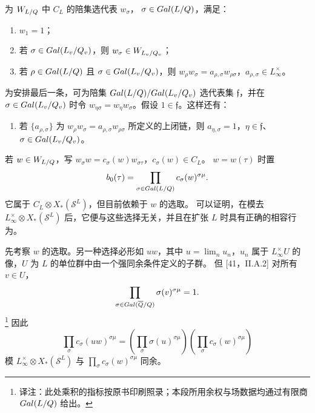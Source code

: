 为 $W_{L/Q}$ 中 $C_L$ 的陪集选代表 $w_\sigma$，
$\sigma\in Gal(L/Q)$，满足：
\begin{enumerate}
\item[(a)] $w_1=1$；
\item[(b)] 若 $\sigma\in Gal(L_v/Q_v)$，则 $w_\sigma\in W_{L_v/Q_v}$；
\item[(c)] 若 $\rho\in Gal(L/Q)$ 且 $\sigma\in Gal(L_v/Q_v)$，则
$w_\rho w_\sigma=a_{\rho,\sigma}w_{\rho\sigma}$，$a_{\rho,\sigma}\in L_\infty^\times$。
\end{enumerate}
为安排最后一条，可为陪集 $Gal(L/Q)/Gal(L_v/Q_v)$ 选代表集
$\mathfrak f$，并在 $\sigma\in Gal(L_v/Q_v)$ 时令
$w_{\eta\sigma}=w_\eta w_\sigma$。假设 $1\in\mathfrak f$。这样还有：
\begin{enumerate}
\item[(d)] 若 $\{a_{\rho,\sigma}\}$ 为
$w_\rho w_\sigma=a_{\rho,\sigma}w_{\rho\sigma}$ 所定义的上闭链，则
$a_{\eta,\sigma}=1$，$\eta\in\mathfrak f$、$\sigma\in Gal(L_v/Q_v)$。
\end{enumerate}
若 $w\in W_{L/Q}$，写
$w_\sigma w=c_\sigma(w)w_{\sigma\tau}$，$c_\sigma(w)\in C_L$。
$w=w(\tau)$ 时置
\[
b_0(\tau)=\prod_{\sigma\in Gal(L/Q)}c_\sigma(w)^{\sigma\mu}.
\]
它属于 $C_L\otimes X_*(\mathcal S^L)$，但目前依赖于 $w$ 的选取。
可以证明，在模去 $L_\infty^\times\otimes X_*(\mathcal S^L)$ 后，它便与这些选择无关，并且在扩张
$L$ 时具有正确的相容行为。

先考察 $w$ 的选取。另一种选择必形如 $uw$，其中
$u=\lim_nu_n$，$u_n$ 属于 $L_\infty^\times U$ 的像，$U$ 为 $L$ 的单位群中由一个强同余条件定义的子群。
但 [41，II.A.2] 对所有 $v\in U$，
\[
\prod_{\sigma\in Gal(\overline{Q}/Q)}\sigma(v)^{\sigma\mu}=1.
\]
\footnote{译注：此处乘积的指标按原书印刷照录；本段所用余权与场数据均通过有限商 $Gal(L/Q)$ 给出。}
因此
\[
\prod_\sigma c_\sigma(uw)^{\sigma\mu}
=\left(\prod_\sigma\sigma(u)^{\sigma\mu}\right)
 \left(\prod_\sigma c_\sigma(w)^{\sigma\mu}\right)
\]
模 $L_\infty^\times\otimes X_*(\mathcal S^L)$ 与
$\prod_\sigma c_\sigma(w)^{\sigma\mu}$ 同余。

